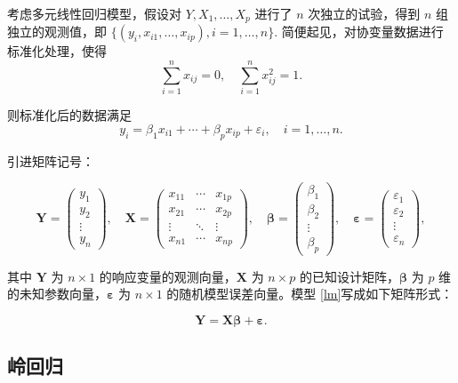 \documentclass[12pt, a4paper, oneside]{ctexart}
\begin{document}
	考虑多元线性回归模型，假设对 $Y, X_1, \dots, X_p$ 进行了 $n$ 次独立的试验，得到 $n$ 组独立的观测值，即 $\{(y_i, x_{i1}, \dots, x_{ip}), i=1,\dots,n\}$. 简便起见，对协变量数据进行标准化处理，使得
	\begin{equation}
		\sum_{i=1}^{n} x_{ij} = 0, \quad \sum_{i=1}^{n} x_{ij}^2 = 1.
	\end{equation}
	
	则标准化后的数据满足
	\begin{equation}
		y_i = \beta_1 x_{i1} + \cdots + \beta_p x_{ip} + \varepsilon_i, \quad i = 1, \dots, n. \label{lm}
	\end{equation}
	
	引进矩阵记号：
	
	\[
	\bm{Y} = 
	\begin{pmatrix}
		y_1 \\
		y_2 \\
		\vdots \\
		y_n
	\end{pmatrix},
	\quad
	\bm{X} = 
	\begin{pmatrix}
		x_{11} & \cdots & x_{1p} \\
		x_{21} & \cdots & x_{2p} \\
		\vdots & \ddots & \vdots \\
		x_{n1} & \cdots & x_{np}
	\end{pmatrix},
	\quad
	\bm{\beta} = 
	\begin{pmatrix}
		\beta_1 \\
		\beta_2 \\
		\vdots \\
		\beta_p
	\end{pmatrix},
	\quad
	\bm{\varepsilon} = 
	\begin{pmatrix}
		\varepsilon_1 \\
		\varepsilon_2 \\
		\vdots \\
		\varepsilon_n
	\end{pmatrix},
	\]
	
	其中 $\bm{Y}$ 为 $n \times 1$ 的响应变量的观测向量，$\bm{X}$ 为 $n \times p$ 的已知设计矩阵，$\bm{\beta}$ 为 $p$ 维的未知参数向量，$\bm{\varepsilon}$ 为 $n \times 1$ 的随机模型误差向量。模型 \eqref{lm}写成如下矩阵形式：
	
	\begin{equation}
		\bm{Y} = \bm{X} \bm{\beta} + \bm{\varepsilon}.\label{matrixlm}
	\end{equation}
	
	
	\subsection{岭回归}
\end{document}
